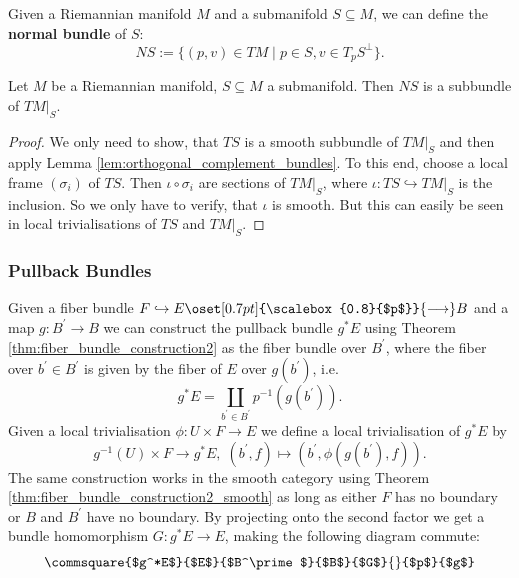     Given a Riemannian manifold $M$ and a submanifold $S \subseteq M$, we can define the \textbf{normal bundle} of $S$:
    \[NS := \{(p,v) \in TM \mid p \in S, v \in T_pS^\perp\}.\]
    \begin{corollary}
        Let $M$ be a Riemannian manifold, $S\subseteq M$ a submanifold. Then $NS$ is a subbundle of $TM|_S$.
    \end{corollary}
    \begin{proof}
        We only need to show, that $TS$ is a smooth subbundle of $TM|_S$ and then apply Lemma \ref{lem:orthogonal_complement_bundles}. To this end, choose a local frame $(\sigma_i)$ of $TS$. Then $\iota \circ \sigma_i$ are sections of $TM|_S$, where $\iota \colon TS \hookrightarrow TM|_S$ is the inclusion. So we only have to verify, that $\iota$ is smooth. But this can easily be seen in local trivialisations of $TS$ and $TM|_S$.
    \end{proof}

    \subsubsection{Pullback Bundles}

    Given a fiber bundle $F \hookrightarrow E \oset[0.7pt]{\scalebox{0.8}{$p$}}{\longrightarrow} B$ and a map $g \colon B^\prime \to B$ we can construct the pullback bundle $g^*E$ using Theorem \ref{thm:fiber_bundle_construction2} as the fiber bundle over $B^\prime$, where the fiber over $b^\prime \in B^\prime$ is given by the fiber of $E$ over $g(b^\prime)$, i.e.
    \[
    g^*E = \coprod_{b^\prime \in B^\prime} p^{-1}(g(b^\prime)).
    \]
    Given a local trivialisation $\phi \colon U \times F \to E$ we define a local trivialisation of $g^*E$ by
    \[
    g^{-1}(U) \times F \to g^*E, \; (b^\prime,f) \mapsto (b^\prime,\phi(g(b^\prime),f)).
    \]
    The same construction works in the smooth category using Theorem \ref{thm:fiber_bundle_construction2_smooth} as long as either $F$ has no boundary or $B$ and $B^\prime$ have no boundary. By projecting onto the second factor we get a bundle homomorphism $G \colon g^*E \to E$, making the following diagram commute:
    \[
        \commsquare{$g^*E$}{$E$}{$B^\prime$}{$B$}{$G$}{}{$p$}{$g$}
    \]

